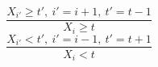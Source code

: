 $$\frac{X_{i'} \geq t',~i'=i+1,~t'=t-1}{X_{i} \geq t}$$ $$\frac{X_{i'}<t',~i'=i-1,~t'=t+1}{X_{i}<t}$$ 
